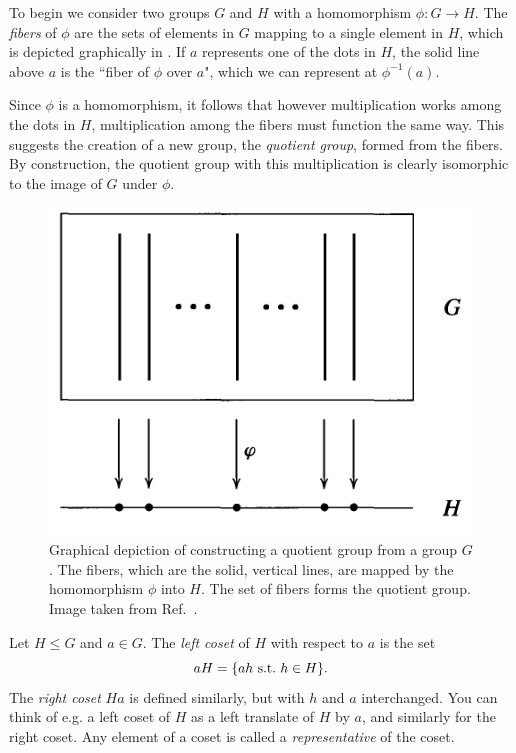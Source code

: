 To begin we consider two groups $G$ and $H$ with a homomorphism $\phi:G\to H$.
The {\it fibers} of $\phi$ are the sets of elements in $G$ mapping
to a single element in $H$, which is depicted graphically in
. If $a$ represents one of the dots in $H$,
the solid line above $a$ is the ``fiber of $\phi$ over $a$", which we can represent
at $\phi^{-1}(a)$.

Since $\phi$ is a homomorphism, it follows that however multiplication works 
among the dots in $H$, multiplication among the fibers must function the same
way. This suggests the creation of a new group, the {\it quotient group},
formed from the fibers. By construction, the quotient group with this
multiplication is clearly isomorphic to the image of $G$ under $\phi$.

\begin{figure}
  \centering
  \includegraphics[width=0.60\linewidth]{figs/quotientGroup.pdf}
  \caption{Graphical depiction of constructing a quotient group from a group
$G$. The fibers, which are the solid, vertical lines, are mapped by the homomorphism 
$\phi$ into $H$. The set of fibers forms the quotient group. Image taken
from Ref.~\cite{dummit_abstract_2004}.}
  \label{fig:quotientGroup}
\end{figure}

Let $H\le G$ and $a\in G$. The {\it left coset} of $H$ with respect to 
$a$ is the set
\begin{equation}
   aH=\{ah~\text{s.t.}~ h\in H\}. 
\end{equation}
The {\it right coset} $Ha$ is defined similarly, but with $h$ and $a$
interchanged. You can think of e.g. a left coset of $H$ as a left translate of
$H$ by $a$, and similarly for the right coset. Any element of a coset is
called a {\it representative} of the coset.


